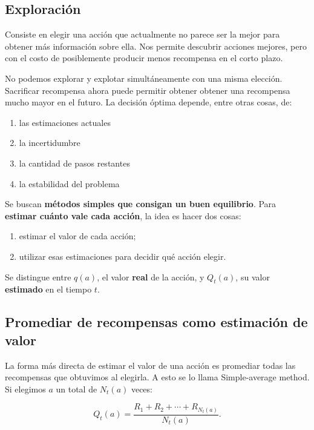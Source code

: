 \documentclass[11pt,a4paper]{article}
\newcommand{\concepto}[1]{%
  \begin{center}
    \fcolorbox{black}{gray!8}{\parbox{0.88\linewidth}{\centering #1}}
  \end{center}%
}
\begin{document}
\subsection{Exploración}

Consiste en elegir una acción que actualmente no parece ser la mejor para
obtener más información sobre ella. Nos permite descubrir acciones mejores,
pero con el costo de posiblemente producir menos recompensa en el corto plazo.


No podemos explorar y explotar simultáneamente con una misma elección.
Sacrificar recompensa ahora puede permitir obtener obtener una recompensa mucho mayor en el
futuro. La decisión óptima depende, entre otras cosas, de:

\begin{enumerate}
  \item las estimaciones actuales
  \item la incertidumbre
  \item la cantidad de pasos restantes
  \item la estabilidad del problema
\end{enumerate}
  
Se buscan \textbf{métodos simples que consigan un buen equilibrio}. Para \textbf{estimar cuánto vale cada acción}, la idea es hacer dos cosas:

\begin{enumerate}
  \item estimar el valor de cada acción;
  \item utilizar esas estimaciones para decidir qué acción elegir.
\end{enumerate}

Se distingue entre $q(a)$, el valor \textbf{real} de la acción, y $Q_t(a)$,
su valor \textbf{estimado} en el tiempo $t$.

\subsection{Promediar de recompensas como estimación de valor}

La forma más directa de estimar el valor de una acción es promediar todas las
recompensas que obtuvimos al elegirla. A esto se lo llama Simple-average method. Si elegimos $a$ un total de
$N_t(a)$ veces:

\begin{equation}
    Q_t(a)=\frac{R_1+R_2+\cdots+R_{N_t(a)}}{N_t(a)}.
\end{equation}
  
\end{document}
